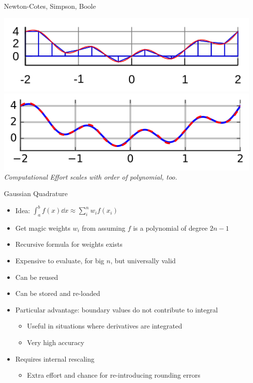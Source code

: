 \begin{frame}{Newton-Cotes, Simpson, Boole}
\begin{minipage}{.39\linewidth}
\includegraphics[width=\linewidth]{./gfx/03-rule02-trapezoid}
\includegraphics[width=\linewidth]{./gfx/03-rule03-simpson}
%
\emph{Computational Effort scales with order of polynomial, too.}
\end{minipage}
%
\end{frame}


\begin{frame}{Gaussian Quadrature}
%
\begin{itemize}
\item Idea: $\displaystyle \int_a^b f(x) \dd{x} \approx \sum_i^n w_i f(x_i)$
\item Get magic weights $w_i$ from assuming $f$ is a polynomial of degree $2n - 1$
\item Recursive formula for weights exists
\item Expensive to evaluate, for big $n$, but universally valid
\item[\Thus] Can be reused
\item[\Thus] Can be stored and re-loaded
\item Particular advantage: boundary values do not contribute to integral
	\begin{itemize}
	\item Useful in situations where derivatives are integrated
	\item Very high accuracy
	\end{itemize}
\item Requires internal rescaling
	\begin{itemize}
	\item Extra effort and chance for re-introducing rounding errors
	\end{itemize}
\end{itemize}
%
\end{frame}

